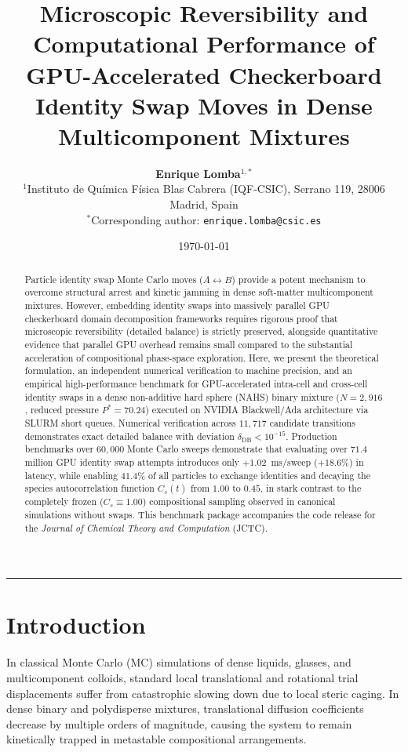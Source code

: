 \documentclass[11pt,a4paper]{article}
\title{\textbf{\Large Microscopic Reversibility and Computational Performance of GPU-Accelerated Checkerboard Identity Swap Moves in Dense Multicomponent Mixtures}}
\author{\textbf{Enrique Lomba}$^{1,*}$ \\[0.5em]
\small $^{1}$Instituto de Química Física Blas Cabrera (IQF-CSIC), Serrano 119, 28006 Madrid, Spain \\
\small $^*$Corresponding author: \texttt{enrique.lomba@csic.es}}
\date{\today}
\begin{document}
\maketitle

\begin{abstract}
Particle identity swap Monte Carlo moves ($A \leftrightarrow B$) provide a potent mechanism to overcome structural arrest and kinetic jamming in dense soft-matter multicomponent mixtures. However, embedding identity swaps into massively parallel GPU checkerboard domain decomposition frameworks requires rigorous proof that microscopic reversibility (detailed balance) is strictly preserved, alongside quantitative evidence that parallel GPU overhead remains small compared to the substantial acceleration of compositional phase-space exploration. Here, we present the theoretical formulation, an independent numerical verification to machine precision, and an empirical high-performance benchmark for GPU-accelerated intra-cell and cross-cell identity swaps in a dense non-additive hard sphere (NAHS) binary mixture ($N = 2,916$, reduced pressure $P^* = 70.24$) executed on NVIDIA Blackwell/Ada architecture via SLURM short queues. Numerical verification across $11,717$ candidate transitions demonstrates exact detailed balance with deviation $\delta_{\text{DB}} < 10^{-15}$. Production benchmarks over $60,000$ Monte Carlo sweeps demonstrate that evaluating over $71.4$ million GPU identity swap attempts introduces only $+1.02$~ms/sweep ($+18.6\%$) in latency, while enabling $41.4\%$ of all particles to exchange identities and decaying the species autocorrelation function $C_s(t)$ from $1.00$ to $0.45$, in stark contrast to the completely frozen ($C_s \equiv 1.00$) compositional sampling observed in canonical simulations without swaps. This benchmark package accompanies the code release for the \textit{Journal of Chemical Theory and Computation} (JCTC).
\end{abstract}

\vspace{1em}
\hrule
\vspace{1em}

\section{Introduction}

In classical Monte Carlo (MC) simulations of dense liquids, glasses, and multicomponent colloids, standard local translational and rotational trial displacements suffer from catastrophic slowing down due to local steric caging. In dense binary and polydisperse mixtures, translational diffusion coefficients decrease by multiple orders of magnitude, causing the system to remain kinetically trapped in metastable compositional arrangements. 
\end{document}

